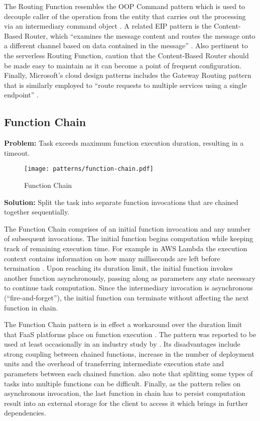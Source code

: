 The Routing Function resembles the OOP Command pattern which is used to decouple caller of the operation from the entity that carries out the processing via an intermediary command object \parencite{gamma94designPatterns}. A related EIP pattern is the Content-Based Router, which ``examines the message content and routes the message onto a different channel based on data contained in the message'' \parencite{hohpe2004enterprise}. Also pertinent to the serverless Routing Function, \textcite{hohpe2004enterprise} caution that the Content-Based Router should be made easy to maintain as it can become a point of frequent configuration. Finally, Microsoft's cloud design patterns includes the Gateway Routing pattern that is similarly employed to ``route requests to multiple services using a single endpoint'' \parencite{microsoft18cloudPatterns}.

\subsection{Function Chain} \label{subsec:functionChain}

\textbf{Problem:} Task exceeds maximum function execution duration, resulting in a timeout.

\begin{figure}[h]
  \centering
  \texttt{[image: patterns/function-chain.pdf]}
  \caption{Function Chain}
  \label{fig:patternFunctionChain}
\end{figure}

\textbf{Solution:} Split the task into separate function invocations that are chained together sequentially.

The Function Chain comprises of an initial function invocation and any number of subsequent invocations. The initial function begins computation while keeping track of remaining execution time. For example in AWS Lambda the execution context contains information on how many milliseconds are left before termination \parencite{awslambda0218}. Upon reaching its duration limit, the initial function invokes another function asynchronously, passing along as parameters any state necessary to continue task computation. Since the intermediary invocation is asynchronous (``fire-and-forget''), the initial function can terminate without affecting the next function in chain.

The Function Chain pattern is in effect a workaround over the duration limit that FaaS platforms place on function execution \parencite{leitner18industrialpractice}. The pattern was reported to be used at least occasionally in an industry study by \textcite{leitner18industrialpractice}. Its disadvantages include strong coupling between chained functions, increase in the number of deployment units and the overhead of transferring intermediate execution state and parameters between each chained function. \textcite{leitner18industrialpractice} also note that splitting some types of tasks into multiple functions can be difficult. Finally, as the pattern relies on asynchronous invocation, the last function in chain has to persist computation result into an external storage for the client to access it which brings in further dependencies.

